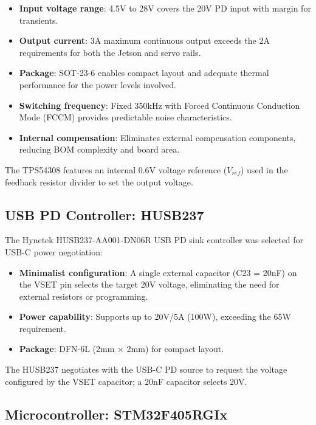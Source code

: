 \documentclass[12pt, titlepage]{article}
\begin{document}
\begin{itemize}[leftmargin=*]
  \item \textbf{Input voltage range}: 4.5V to 28V covers the 20V PD
        input with margin for transients.
  \item \textbf{Output current}: 3A maximum continuous output exceeds
        the 2A requirements for both the Jetson and servo rails.
  \item \textbf{Package}: SOT-23-6 enables compact layout and adequate
        thermal performance for the power levels involved.
  \item \textbf{Switching frequency}: Fixed 350kHz with Forced
        Continuous Conduction Mode (FCCM) provides predictable noise
        characteristics.
  \item \textbf{Internal compensation}: Eliminates external
        compensation components, reducing BOM complexity and board area.
\end{itemize}

The TPS54308 features an internal 0.6V voltage reference ($V_{ref}$) used in
the feedback resistor divider to set the output voltage.

\subsection{USB PD Controller: HUSB237}

The Hynetek HUSB237-AA001-DN06R USB PD sink controller was selected for USB-C
power negotiation: ~\citep{Hynetek_HUSB237_2024}

\begin{itemize}[leftmargin=*]
  \item \textbf{Minimalist configuration}: A single external
        capacitor (C23 = 20nF) on the VSET pin selects the target 20V
        voltage, eliminating the need for external resistors or
        programming.
  \item \textbf{Power capability}: Supports up to 20V/5A (100W),
        exceeding the 65W requirement.
  \item \textbf{Package}: DFN-6L (2mm $\times$ 2mm) for compact layout.
\end{itemize}

The HUSB237 negotiates with the USB-C PD source to request the voltage
configured by the VSET capacitor; a 20nF capacitor selects 20V.

\subsection{Microcontroller: STM32F405RGIx}
\end{document}
